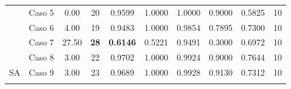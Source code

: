 \begin{table}[]
{\begin{tabular}{cccccccccc}
			\multicolumn{1}{c|}{}                      & Caso 5                        & 0.00                                                                 & 20                                                                 & 0.9599                                                  & 1.0000                        & 1.0000                        & 0.9000                        & 0.5825                        & 10                                                                   \\
			\multicolumn{1}{c|}{}                      & {\color[HTML]{003532} Caso 6} & {\color[HTML]{003532} 4.00}                                          & {\color[HTML]{003532} 19}                                          & {\color[HTML]{003532} 0.9483}                           & {\color[HTML]{003532} 1.0000} & {\color[HTML]{003532} 0.9854} & {\color[HTML]{003532} 0.7895} & {\color[HTML]{003532} 0.7300} & {\color[HTML]{003532} 10}                                            \\
			\multicolumn{1}{c|}{}                      & Caso 7                        & 27.50                                                                & {\color[HTML]{9A0000} \textbf{28}}                                 & {\color[HTML]{9A0000} \textbf{0.6146}}                  & 0.5221                        & 0.9491                        & 0.3000                        & 0.6972                        & 10                                                                   \\
			\multicolumn{1}{c|}{}                      & {\color[HTML]{003532} Caso 8} & {\color[HTML]{003532} 3.00}                                          & {\color[HTML]{003532} 22}                                          & {\color[HTML]{003532} 0.9702}                           & {\color[HTML]{003532} 1.0000} & {\color[HTML]{003532} 0.9924} & {\color[HTML]{003532} 0.9000} & {\color[HTML]{003532} 0.7644} & {\color[HTML]{003532} 10}                                            \\
			\multicolumn{1}{c|}{\multirow{-8}{*}{SA}}  & Caso 9                        & 3.00                                                                 & 23                                                                 & 0.9689                                                  & 1.0000                        & 0.9928                        & 0.9130                        & 0.7312                        & 10                                                                   \\
			\multicolumn{10}{c}{}                                                                                                                                                                                                                                                                                                                                                                                                                                                                   \\

\end{tabular}}
\end{table}
